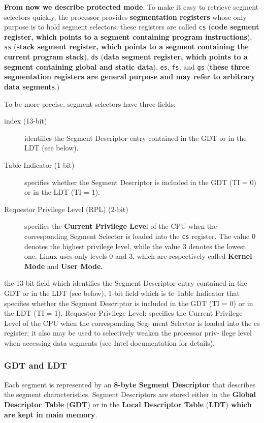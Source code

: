 \documentclass[10pt,a4paper]{article}
\begin{document}
\textbf{From now we describe protected mode}. To make it easy to retrieve segment selectors quickly, the processor provides \textbf{segmentation registers} whose only purpose is to hold segment selectors; these registers are called \texttt{cs} (\textbf{code segment register, which points to a segment containing program instructions}), \texttt{ss} (\textbf{stack segment register, which points to a segment containing the current program stack}), \texttt{ds} (\textbf{data segment register, which points to a segment containing global and static data}), \texttt{es}, \texttt{fs}, and \texttt{gs} (\textbf{these three segmentation registers are general purpose and may refer to arbitrary data segments}.)

To be more precise, segment selectors have three fields:
\begin{description}
\item[index (13-bit)] identifies the Segment Descriptor entry contained in the GDT or in the LDT (see below).
\item[Table Indicator (1-bit)] specifies whether the Segment Descriptor is included in the GDT (TI = 0) or in the LDT (TI = 1).
\item[Requestor Privilege Level (RPL) (2-bit)] specifies the \textbf{Current Privilege Leve}l of the CPU when the corresponding Segment Selector is loaded into the \texttt{cs} register. The value 0 denotes the highest privilege level, while the value 3 denotes the lowest one. Linux uses only levels 0 and 3, which are respectively called \textbf{Kernel Mode} and \textbf{User Mode.}

\end{description}

 the 13-bit field which identifies the Segment Descriptor entry contained in the GDT or in the LDT (see below), 1-bit field which is te Table Indicator that specifies whether the Segment Descriptor is included in the GDT (TI = 0) or in the LDT (TI = 1). Requestor Privilege Level: specifies the Current Privilege Level of the CPU when the corresponding Seg-
ment Selector is loaded into the cs register; it also may be used to selectively weaken the processor priv-
ilege level when accessing data segments (see Intel documentation for details).

\subsubsection{GDT and LDT}

Each segment is represented by an \textbf{8-byte Segment Descriptor} that describes the segment characteristics. Segment Descriptors are stored either in the \textbf{Global Descriptor Table} (\textbf{GDT}) or in the \textbf{Local Descriptor Table} (\textbf{LDT}) \textbf{which are kept in main memory}.
\end{document}
